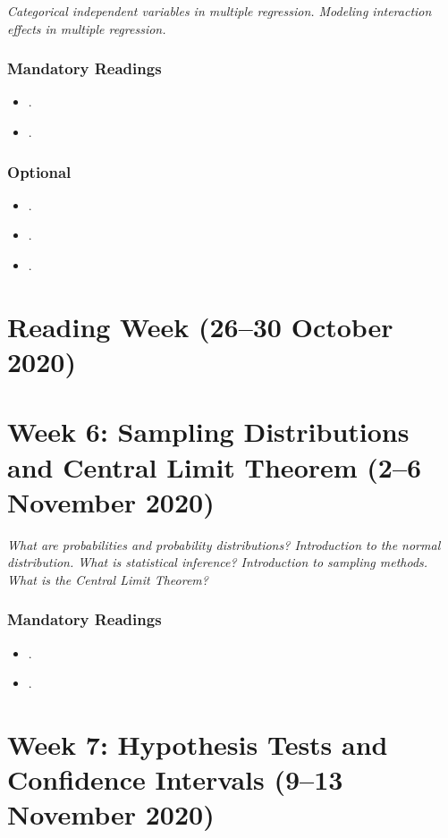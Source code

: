 \documentclass[abstract=on,parskip=full,headings=standardclasses,fontsize=11pt,paper=a4]{scrartcl}
\begin{document}
\textit{Categorical independent variables in multiple regression. Modeling interaction effects in multiple regression.}

\subsubsection*{Mandatory Readings}
\begin{itemize}
\item {}.
\item {}.
\end{itemize}


\subsubsection*{Optional}
\begin{itemize}
\item {}.
\item {}.
\item {}.
\end{itemize}

\section{Reading Week (26--30 October 2020) }






\section{Week 6:  Sampling Distributions and Central Limit Theorem (2--6 November 2020)}


\textit{What are probabilities and probability distributions? Introduction to the normal distribution. What is statistical inference? Introduction to sampling methods. What is the Central Limit Theorem?}


\subsubsection*{Mandatory Readings}
\begin{itemize}
\item {}.
\item {}.
\end{itemize}


\section{Week 7:  Hypothesis Tests and Confidence Intervals (9--13 November 2020)}
\end{document}

